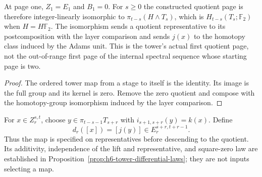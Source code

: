 \begin{proposition}
  \label{prop:h6-first-page-homology}
  \leanok
  At page one, $Z_1=E_1$ and $B_1=0$. For $s\ge0$ the constructed quotient
  page is therefore integer-linearly isomorphic to
  $\pi_{t-s}(H\wedge T_s)$, which is $H_{t-s}(T_s;\mathbb F_2)$ when
  $H=H\mathbb F_2$. The isomorphism sends a quotient representative to
  its postcomposition with the layer comparison and sends $j(x)$ to the
  homotopy class induced by the Adams unit. This is the tower's actual
  first quotient page, not the out-of-range first page of the internal
  spectral sequence whose starting page is two.
\end{proposition}
\begin{proof}
  The ordered tower map from a stage to itself is the identity. Its image
  is the full group and its kernel is zero. Remove the zero quotient and
  compose with the homotopy-group isomorphism induced by the layer comparison.
  \leanok
\end{proof}

\begin{definition}
  \label{def:h6-tower-differential}
  \leanok
  For $x\in Z_r^{s,t}$, choose $y\in\pi_{t-s-1}T_{s+r}$ with
  $i_{s+1,s+r}(y)=k(x)$.  Define
  \[
    d_r([x])=[j(y)]\in E_r^{s+r,t+r-1}.
  \]
  Thus the map is specified on representatives before descending to the
  quotient.  Its additivity, independence of the lift and representative,
  and square-zero law are established in Proposition~\ref{prop:h6-tower-differential-laws}; they are not inputs selecting a map.
\end{definition}

